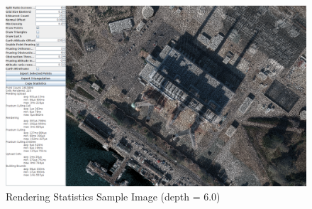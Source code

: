 \begin{figure}[htp]
\begin{center}
  \includegraphics[width=6.0in]{images/rendering6.png}
  \caption{Rendering Statistics Sample Image (depth = 6.0)}
  \label{fig:rendering6}
\end{center}
\end{figure}

























